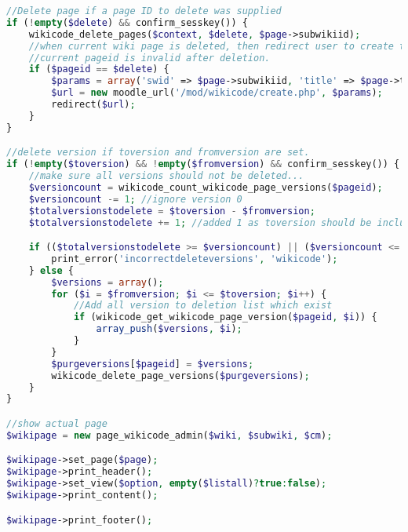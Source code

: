 \begin{lstlisting}[language=PHP]
//Delete page if a page ID to delete was supplied
if (!empty($delete) && confirm_sesskey()) {
    wikicode_delete_pages($context, $delete, $page->subwikiid);
    //when current wiki page is deleted, then redirect user to create that page, as
    //current pageid is invalid after deletion.
    if ($pageid == $delete) {
        $params = array('swid' => $page->subwikiid, 'title' => $page->title);
        $url = new moodle_url('/mod/wikicode/create.php', $params);
        redirect($url);
    }
}

//delete version if toversion and fromversion are set.
if (!empty($toversion) && !empty($fromversion) && confirm_sesskey()) {
    //make sure all versions should not be deleted...
    $versioncount = wikicode_count_wikicode_page_versions($pageid);
    $versioncount -= 1; //ignore version 0
    $totalversionstodelete = $toversion - $fromversion;
    $totalversionstodelete += 1; //added 1 as toversion should be included

    if (($totalversionstodelete >= $versioncount) || ($versioncount <= 1)) {
        print_error('incorrectdeleteversions', 'wikicode');
    } else {
        $versions = array();
        for ($i = $fromversion; $i <= $toversion; $i++) {
            //Add all version to deletion list which exist
            if (wikicode_get_wikicode_page_version($pageid, $i)) {
                array_push($versions, $i);
            }
        }
        $purgeversions[$pageid] = $versions;
        wikicode_delete_page_versions($purgeversions);
    }
}

//show actual page
$wikipage = new page_wikicode_admin($wiki, $subwiki, $cm);

$wikipage->set_page($page);
$wikipage->print_header();
$wikipage->set_view($option, empty($listall)?true:false);
$wikipage->print_content();

$wikipage->print_footer();
\end{lstlisting}

